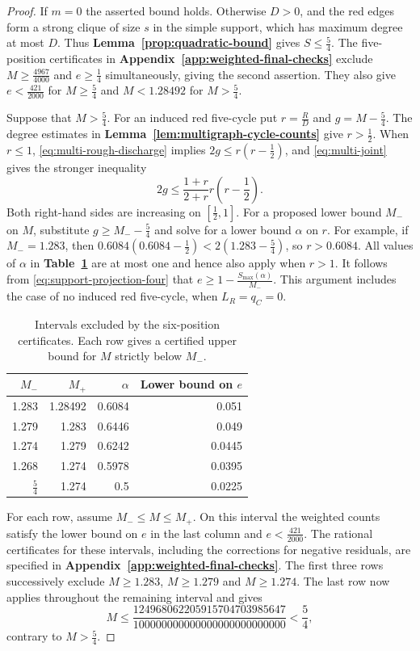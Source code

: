 \documentclass[preprint,11pt,numbers]{elsarticle-arxiv}
\numberwithin{equation}{section}
\theoremstyle{definition}
\begin{document}
\begin{proof}
If $m=0$ the asserted bound holds. Otherwise $D>0$, and the
red edges form a strong clique of size $s$ in the simple support,
which has maximum degree at most $D$. Thus
\textbf{Lemma~\ref{prop:quadratic-bound}} gives $S\leq\frac{5}{4}$.
The five-position certificates in \textbf{Appendix~\ref{app:weighted-final-checks}}
exclude $M\geq\frac{4967}{4000}$ and $e\geq\frac14$ simultaneously,
giving the second assertion. They also give
$e<\frac{421}{2000}$ for $M\geq\frac54$ and $M<1.28492$ for
$M>\frac54$.

Suppose that $M>\frac54$. For an induced red five-cycle put
$r=\frac RD$ and $g=M-\frac54$. The degree estimates in
\textbf{Lemma~\ref{lem:multigraph-cycle-counts}} give $r>\frac12$.
When $r\leq1$, \eqref{eq:multi-rough-discharge} implies
$2g\leq r(r-\frac12)$, and \eqref{eq:multi-joint} gives the
stronger inequality
\[
 2g\leq\frac{1+r}{2+r}r\left(r-\frac12\right).
\]
Both right-hand sides are increasing on $[\frac12,1]$.
For a proposed lower bound $M_-$ on $M$, substitute
$g\geq M_--\frac54$ and solve for a lower bound $\alpha$ on $r$.
For example, if $M_-=1.283$, then
$0.6084(0.6084-\frac12)<2(1.283-\frac54)$, so $r>0.6084$.
All values of $\alpha$ in \textbf{Table~\ref{tab:uniform-chain}}
are at most one and hence also apply when $r>1$.
It follows from \eqref{eq:support-projection-four} that
$e\geq1-\frac{S_{\max}(\alpha)}{M_-}$. This argument includes the
case of no induced red five-cycle, when $L_R=q_C=0$.

\begin{table}[htbp]
\centering
\caption{Intervals excluded by the six-position certificates. Each row
gives a certified upper bound for $M$ strictly below $M_-$.}
\label{tab:uniform-chain}
\begin{tabular}{@{}rrrr@{}}
\toprule
$M_-$ & $M_+$ & $\alpha$ & Lower bound on $e$\\
\midrule
1.283 & 1.28492 & 0.6084 & 0.051\\
1.279 & 1.283 & 0.6446 & 0.049\\
1.274 & 1.279 & 0.6242 & 0.0445\\
1.268 & 1.274 & 0.5978 & 0.0395\\
$\frac54$ & 1.274 & 0.5 & 0.0225\\
\bottomrule
\end{tabular}
\end{table}

For each row, assume $M_-\leq M\leq M_+$. On this interval the
weighted counts satisfy the lower bound on $e$ in the last column
and $e<\frac{421}{2000}$. The rational certificates for these
intervals, including the corrections for negative residuals, are
specified in \textbf{Appendix~\ref{app:weighted-final-checks}}. The first three
rows successively exclude $M\geq1.283$, $M\geq1.279$ and
$M\geq1.274$. The last row now applies throughout the remaining
interval and gives
\[
 M\leq\frac{124968062205915704703985647}
                 {100000000000000000000000000}<\frac54,
\]
contrary to $M>\frac54$.
\end{proof}
\end{document}
